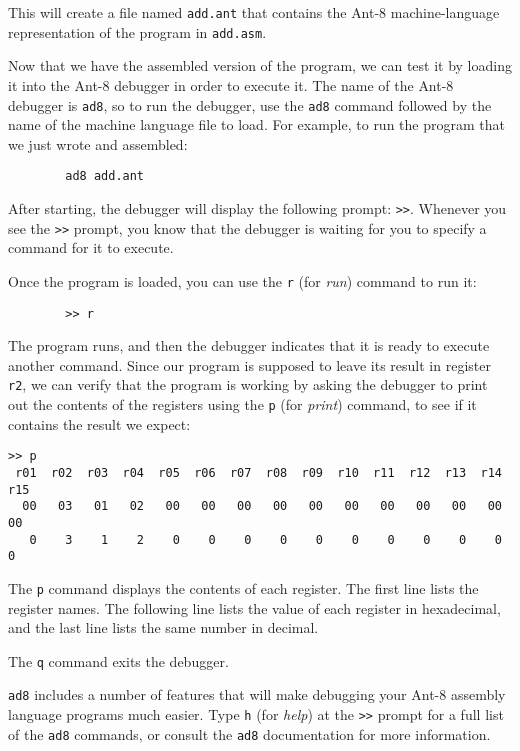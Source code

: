 This will create a file named {\tt add.ant} that contains
the {\sc Ant-8} machine-language representation of the program in
{\tt add.asm}.

Now that we have the assembled version of the program,
we can test it by loading it into the {\sc Ant-8} debugger in
order to execute it.
The name of the {\sc Ant-8} debugger is {\tt ad8}, so to run the debugger,
use the {\tt ad8} command followed
by the name of the machine language file to load.
For example, to run the program that we just wrote
and assembled:

\begin{verbatim}
        ad8 add.ant
\end{verbatim}

After starting, the debugger will display the following
prompt: {\tt >>}.
Whenever you see the {\tt >>} prompt, you know that the debugger
is waiting for you to specify a command for it to execute.

Once the program is loaded, you can use the {\tt r} (for {\em run})
command to run it:
\begin{verbatim}
        >> r
\end{verbatim}

The program runs, and then the debugger indicates that it is ready to
execute another command.  Since our program is supposed to
leave its result in register {\tt r2}, we can verify that the
program is working by asking the debugger to print out the contents of
the registers using the {\tt p} (for {\em print}) command,
to see if it contains the result we expect:

{\codesize
\begin{verbatim}
>> p 
 r01  r02  r03  r04  r05  r06  r07  r08  r09  r10  r11  r12  r13  r14  r15
  00   03   01   02   00   00   00   00   00   00   00   00   00   00   00
   0    3    1    2    0    0    0    0    0    0    0    0    0    0    0
\end{verbatim}}

The {\tt p} command displays the contents of each register.
The first line lists the register names.  The following line
lists the value of each register in hexadecimal, and the
last line lists the same number in decimal.

The {\tt q} command exits the debugger.

{\tt ad8} includes a number of features that will make debugging your
{\sc Ant-8} assembly language programs much easier.  Type {\tt h} (for {\em help})
at the
{\tt >>} prompt for a full list of the {\tt ad8} commands, or consult the
{\tt ad8} documentation for more information.

